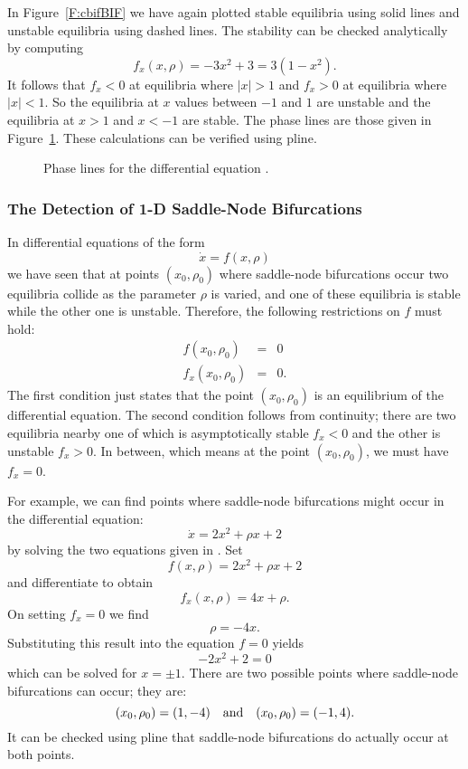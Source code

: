 \documentclass{ximera}
\begin{document}
In Figure~\ref{F:cbifBIF} we have again plotted stable equilibria
 using solid lines and unstable equilibria
 using dashed lines.  The
stability can be checked analytically by computing
\[
f_x(x,\rho) = -3x^2+3 = 3(1-x^2).
\]
It follows that $f_x<0$ at equilibria where $|x|>1$ and $f_x>0$ at 
equilibria where $|x|<1$.  So the equilibria at $x$ values between 
$-1$ and $1$ are unstable and the equilibria at $x>1$ and $x<-1$ are 
stable.  The phase lines are those given in Figure~\ref{F:cbif}.  These 
calculations can be verified using {\sf pline}. 

\vspace{0.4in}

\begin{figure}[htb]
           \centerline{%
           }
           \caption{Phase lines for the differential equation
        \protect{}.}
           \label{F:cbif}
\end{figure}

\subsubsection*{The Detection of 1-D Saddle-Node Bifurcations}

In differential equations of the form
\[
\dot{x} = f(x,\rho)
\]
we have seen that at points $(x_0,\rho_0)$ where saddle-node bifurcations
occur two equilibria collide as the parameter $\rho$ is varied, and one of 
these equilibria is stable while the other one is unstable.  Therefore, the
following restrictions on $f$ must hold:
\begin{equation}  \label{E:DCSN}
\begin{array}{rcl}
f(x_0,\rho_0) & = & 0\\
f_x(x_0,\rho_0) & = & 0.
\end{array}
\end{equation}
The first condition just states that the point $(x_0,\rho_0)$ is an
equilibrium of the differential equation.  The second condition follows from
continuity; there are two equilibria nearby one of which is asymptotically 
stable $f_x<0$ and the other is unstable $f_x>0$.  In between, which means at
the point $(x_0,\rho_0)$, we must have $f_x=0$.

For example, we can find points where saddle-node bifurcations might occur in 
the differential equation:
\[
\dot{x} = 2x^2 +\rho x + 2
\]
by solving the two equations given in .  Set 
\[
f(x,\rho) = 2x^2 +\rho x + 2
\]
and differentiate to obtain
\[
f_x(x,\rho) = 4x + \rho.
\]
On setting $f_x=0$ we find
\[
\rho = -4x.
\]
Substituting this result into the equation $f=0$ yields
\[
-2x^2 + 2 =0
\]
which can be solved for $x=\pm 1$.  There are two possible points where
saddle-node bifurcations can occur; they are:
\[
(x_0,\rho_0) = (1,-4) \quad\mbox{and}\quad  (x_0,\rho_0) = (-1,4).
\]
It can be checked using {\sf pline} that saddle-node bifurcations do actually
occur at both points.
\end{document}
